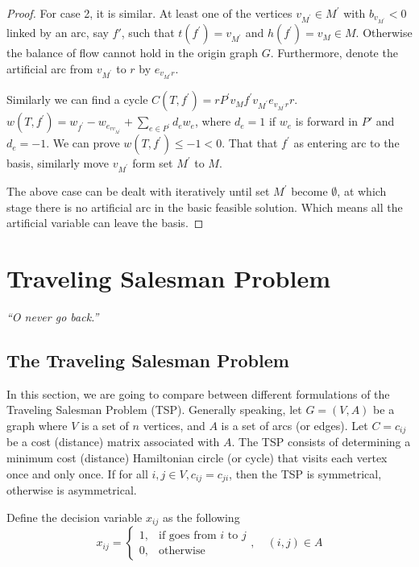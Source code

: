 \begin{proof}
                        For case 2, it is similar. At least one of the vertices $v_{M^\prime} \in M^\prime$ with $b_{v_{M^\prime}} < 0$ linked by an arc, say $f\prime$, such that $t(f^\prime) = v_{M^\prime}$ and $h(f^\prime) = v_M \in M$. Otherwise the balance of flow cannot hold in the origin graph $G$. Furthermore, denote the artificial arc from $v_{M^\prime}$ to $r$ by $e_{v_{M^\prime}r}$.

                        Similarly we can find a cycle $C(T, f^\prime) = rP^\prime v_M f^\prime v_{M^\prime}e_{v_{M^\prime}r}r$. $w(T, f^\prime) = w_{f^\prime} - w_{e_{rv_{M^\prime}}} + \sum_{e \in P^\prime} d_e w_e$, where $d_e = 1$ if $w_e$ is forward in $P\prime$ and $d_e = -1$. We can prove $w(T, f^\prime) \le -1 < 0$. That that $f^\prime$ as entering arc to the basis, similarly move $v_{M^\prime}$ form set $M^\prime$ to $M$.

                        The above case can be dealt with iteratively until set $M^\prime$ become $\emptyset$, at which stage there is no artificial arc in the basic feasible solution. Which means all the artificial variable can leave the basis.
                    \end{proof}

    \chapter{Traveling Salesman Problem}
        \begin{center}
            \textit{``O never go back.''}
        \end{center}

        \section{The Traveling Salesman Problem}
            In this section, we are going to compare between different formulations of the Traveling Salesman Problem (TSP). Generally speaking, let $G = (V, A)$ be a graph where $V$ is a set of $n$ vertices, and $A$ is a set of arcs (or edges). Let $C = c_{ij}$ be a cost (distance) matrix associated with $A$. The TSP consists of determining a minimum cost (distance) Hamiltonian circle (or cycle) that visits each vertex once and only once. If for all $i, j \in V, c_{ij} = c_{ji}$, then the TSP is symmetrical, otherwise is asymmetrical.

            Define the decision variable $x_{ij}$ as the following
            \begin{equation}
                x_{ij} = \begin{cases}
                    1, &\text{if goes from } i \text{ to } j\\ 
                    0, & \text{otherwise}
                \end{cases}, \quad (i, j) \in A
            \end{equation}

